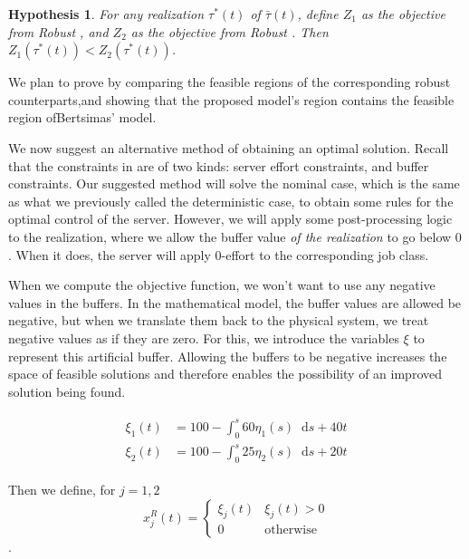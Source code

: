 \documentclass[11pt,a4paper,titlepage]{article}
\newcommand*{\dd}{\ensuremath{\mathop{}\!\mathrm{d}}}%
\theoremstyle{definition}
\theoremstyle{plain}
\newtheorem{claim}{Hypothesis}
\begin{document}
    \begin{claim}
        \label{claim:modelone-better}
        For any realization $\tau^*(t)$ of $\bar{\tau}(t)$,
        define $Z_1$ as the objective from Robust \modelone,
        and $Z_2$ as the objective from Robust \modeltwo.
        Then $Z_1(\tau^*(t)) < Z_2(\tau^*(t))$.
    \end{claim}

    We plan to prove  by comparing the feasible regions of the corresponding robust counterparts,and showing that the proposed model’s region contains the feasible region ofBertsimas’ model.

    We now suggest an alternative method of obtaining an optimal solution.
    Recall that the constraints in 
    are of two kinds:
    server effort constraints,
    and buffer constraints.
    Our suggested method will solve the nominal case,
    which is the same as what we previously called the deterministic case,
    to obtain some rules for the optimal control of the server.
    However,
    we will apply some post-processing logic to the realization,
    where we allow the buffer value \textit{of the realization}
    to go below $0$.
    When it does,
    the server will apply $0$-effort to the corresponding job class.

    When we compute the objective function,
    we won't want to use any negative values in the buffers.
    In the mathematical model,
    the buffer values are allowed be negative,
    but when we translate them back to the physical system,
    we treat negative values as if they are zero.
    For this,
    we introduce the variables $\xi$ to represent this artificial buffer.
    Allowing the buffers to be negative increases the space of feasible solutions and therefore enables the possibility of an improved solution being found.

    \begin{align}
        \begin{split}
            \xi_1(t) & = 100 - \int_0^s 60 \eta_1(s) \dd s  + 40t \\
            \xi_2(t) & = 100 - \int_0^s 25 \eta_2(s) \dd s  + 20t
        \end{split}
    \end{align}

    Then we define, for $j=1,2$
    \begin{equation}
        x_j^R(t) =
        \begin{cases}
            \xi_j(t) & \xi_j(t) > 0 \\
            0 & \text{otherwise}
        \end{cases}
    \end{equation}.
\end{document}
